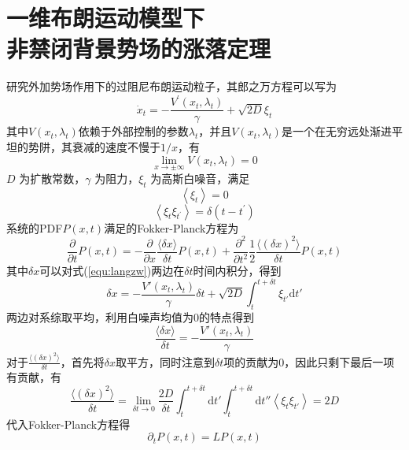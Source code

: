 \section{一维布朗运动模型下\\非禁闭背景势场的涨落定理}
研究外加势场作用下的过阻尼布朗运动粒子，其郎之万方程可以写为
\begin{equation}
\dot{x}_{t}=-\frac{V^{\prime}\left(x_{t}, \lambda_{t}\right)}{\gamma}+\sqrt{2 D} \xi_{t}
\label{equ:langzw}
\end{equation}
其中$V(x_t,\lambda_t)$依赖于外部控制的参数$\lambda_t$，并且$V(x_t,\lambda_t)$是一个在无穷远处渐进平坦的势阱，其衰减的速度不慢于$1/x$，有
\begin{equation}
\lim\limits_{x\rightarrow\pm\infty}V(x_t,\lambda_t)=0
\end{equation}
$D$ 为扩散常数，$\gamma$ 为阻力，$\xi_t$ 为高斯白噪音，满足
\begin{equation}
\left\langle\xi_t\right\rangle=0
\end{equation}
\begin{equation}
\left\langle\xi_{t} \xi_{t^{\prime}}\right\rangle=\delta\left(t-t^{\prime}\right)
\end{equation}
系统的PDF$P(x,t)$满足的Fokker-Planck方程为
\begin{equation}
\frac{\partial}{\partial t}P(x,t)=-\frac{\partial}{\partial x}\frac{\langle\delta x\rangle}{\delta t}P(x,t)+\frac{\partial^2}{\partial t^2}\frac{1}{2}\frac{\langle(\delta x)^2\rangle}{\delta t}P(x,t)
\end{equation}
其中$\delta x$可以对式(\ref{equ:langzw})两边在$\delta t$时间内积分，得到
\begin{equation}
\delta x=-\frac{V'(x_t,\lambda_t)}{\gamma}\delta t+\sqrt{2D}\int^{t+\delta t}_{t}\xi_{t'}\mathrm{d}t'
\end{equation}
两边对系综取平均，利用白噪声均值为0的特点得到
\begin{equation}
\frac{\langle\delta x\rangle}{\delta t}=-\frac{V'(x_t,\lambda_t)}{\gamma}
\end{equation}
对于$\frac{\langle(\delta x)^2\rangle}{\delta t}$，首先将$\delta x$取平方，同时注意到$\delta t$项的贡献为0，因此只剩下最后一项有贡献，有
\begin{equation}
\frac{\langle(\delta x)^2\rangle}{\delta t}=\lim\limits_{\delta t\rightarrow0}\frac{2D}{\delta t}\int^{t+\delta t}_t\mathrm{d}t'\int^{t+\delta t}_t\mathrm{d}t''\left\langle\xi_t\xi_{t'}\right\rangle=2D
\end{equation}
代入Fokker-Planck方程得
\begin{equation}
\partial_{t} P(x, t)=L P(x, t)
\end{equation}
